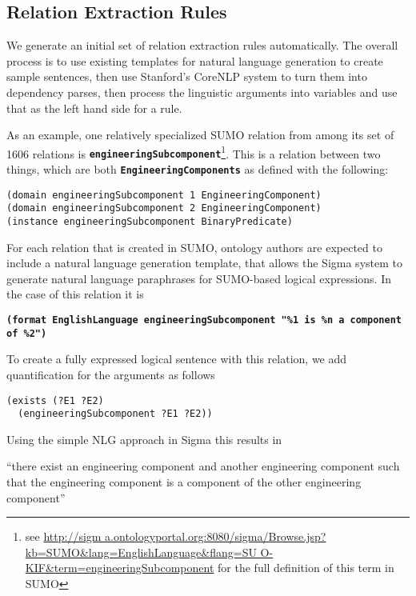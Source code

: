 \documentclass{book}
\newcommand{\tsumo}[1]{{\small \textbf{\texttt{#1}}}}
\begin{document}
\subsection{Relation Extraction Rules}

We generate an initial set of relation extraction rules automatically.  The overall
process is to use existing templates for natural language generation to create sample
sentences, then use Stanford's CoreNLP system to turn them into dependency parses,
then process the linguistic arguments into variables and use that as the left hand
side for a rule.

As an example, one relatively specialized SUMO relation from among its set of
1606 relations is \tsumo{engineeringSubcomponent}\footnote{see \url{http://sigm
a.ontologyportal.org:8080/sigma/Browse.jsp?kb=SUMO&lang=EnglishLanguage&flang=SU
O-KIF&term=engineeringSubcomponent} for the full definition of this term in
SUMO}. This is a relation between two things, which are both
\tsumo{EngineeringComponents} as defined with the following:

\begin{lstlisting}[basicstyle=\ttfamily\small\bfseries]
(domain engineeringSubcomponent 1 EngineeringComponent)	
(domain engineeringSubcomponent 2 EngineeringComponent)	
(instance engineeringSubcomponent BinaryPredicate)
\end{lstlisting}

For each relation
that is created in SUMO, ontology authors are expected to include a natural
language generation template, that allows the Sigma\citep{ac13} system to generate natural
language paraphrases for SUMO-based logical expressions.  In the case of this
relation it is

\tsumo{(format EnglishLanguage engineeringSubcomponent "\%1 is \%n a component of \%2")}

To create a fully expressed logical sentence with this relation, we add quantification
for the arguments as follows

\begin{lstlisting}[basicstyle=\ttfamily\small\bfseries]
(exists (?E1 ?E2)
  (engineeringSubcomponent ?E1 ?E2))
\end{lstlisting}

Using the simple NLG approach in Sigma this results in

``there exist an engineering component and another engineering component such
that the engineering component is a component of the other engineering
component''
\end{document}
